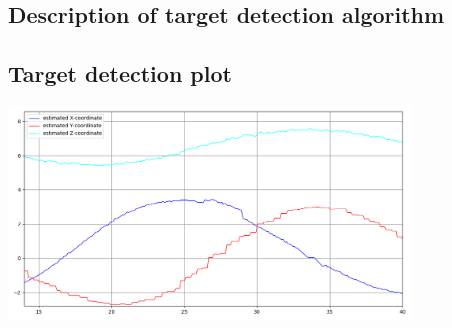 \subsection{Description of target detection algorithm}

\subsection{Target detection plot}
\begin{center}
    \includegraphics[width=0.8\textwidth]{plots/q2_2.png}
\end{center}
